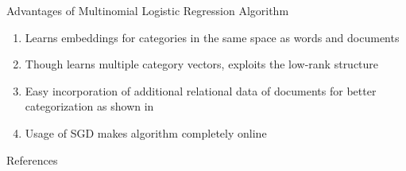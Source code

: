\documentclass[10pt]{beamer}
\begin{document}

\begin{frame}{Advantages of Multinomial Logistic Regression Algorithm }

\begin{enumerate}
	\vfill\item<1-> Learns embeddings for categories in the same space as words and documents
	\vfill\item<2-> Though learns multiple category vectors, exploits the low-rank structure
	\vfill\item<3-> Easy incorporation of additional relational data of documents for better categorization as shown in \citet{gupta2015collectively}
	\vfill\item<4-> Usage of SGD makes algorithm completely online
\end{enumerate}
\end{frame}



\begin{frame}{References}
    
    
\end{frame}
\end{document}
